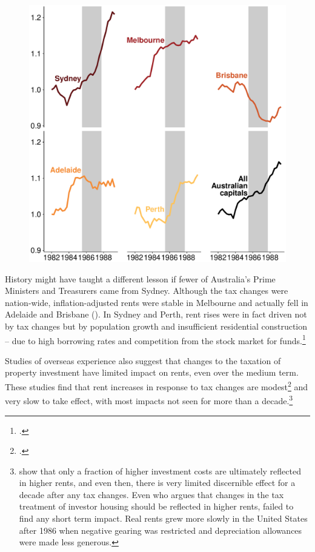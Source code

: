 \begin{figure}
\includegraphics[width=\columnwidth]{CGT-NG-atlas/Capital_city_rents_direct_abs-1}
\end{figure}

History might have taught a different lesson if fewer of Australia’s Prime Ministers and Treasurers came from Sydney. Although the tax changes were nation-wide, inflation-adjusted rents were stable in Melbourne and actually fell in Adelaide and Brisbane (). In Sydney and Perth, rent rises were in fact driven not by tax changes but by population growth and insufficient residential construction – due to high borrowing rates and competition from the stock market for funds.\footcites[][186]{BadcockBrowett1991}[][47--48]{DaleyMcGannonSavageEtAl2013BalancingBudgets}

Studies of overseas experience also suggest that changes to the taxation of property investment have limited impact on rents, even over the medium term. These studies find that rent increases in response to tax changes are modest\footcite{DiPasqualeWheaton1992}  and very slow to take effect, with most impacts not seen for more than a decade.\footnote{\textcite{BlackleyFollain1996}\label{footnote:BlackleyFollain} show that only a fraction of higher investment costs are ultimately reflected in higher rents, and even then, there is very limited discernible effect for a decade after any tax changes. Even \textcite{Poterba1992} who argues that changes in the tax treatment of investor housing should be reflected in higher rents, failed to find any short term impact. Real rents grew more slowly in the United States after 1986 when negative gearing was restricted and depreciation allowances were made less generous.}\label{endnote:BlackleyFollain}


